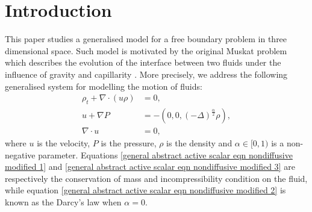 \documentclass[reqno]{amsart}%
\theoremstyle{definition}
\theoremstyle{remark}
\numberwithin{equation}{section}
\newcommand{\0}{\mathbf{0}}
\newcommand{\1}{\mathbf{1}}
\numberwithin{equation}{section}
\numberwithin{theorem}{section}
\numberwithin{figure}{section}
\begin{document}
\maketitle
\section{Introduction}\label{introduction}

This paper studies a generalised model for a free boundary problem in three dimensional space. Such model is motivated by the original Muskat problem which describes the evolution of the interface between two fluids under the influence of gravity and capillarity \cite{Musk37}. More precisely, we address the following generalised system for modelling the motion of fluids:
\begin{align}
\rho_t + \nabla \cdot  (u\rho) &= 0, \label{general abstract active scalar eqn nondiffusive modified 1}\\
u + \nabla P &= - (0,0,(-\Delta)^\frac{\alpha}{2}\rho), \label{general abstract active scalar eqn nondiffusive modified 2}\\
\nabla \cdot u &= 0 \label{general abstract active scalar eqn nondiffusive modified 3},
\end{align}
where $u$ is the velocity, $P$ is the pressure, $\rho$ is the density and $\alpha\in[0,1)$ is a non-negative parameter. Equations \eqref{general abstract active scalar eqn nondiffusive modified 1} and \eqref{general abstract active scalar eqn nondiffusive modified 3} are respectively the conservation of mass and incompressibility condition on the fluid, while equation \eqref{general abstract active scalar eqn nondiffusive modified 2} is known as the Darcy's law when $\alpha=0$. 
\end{document}
